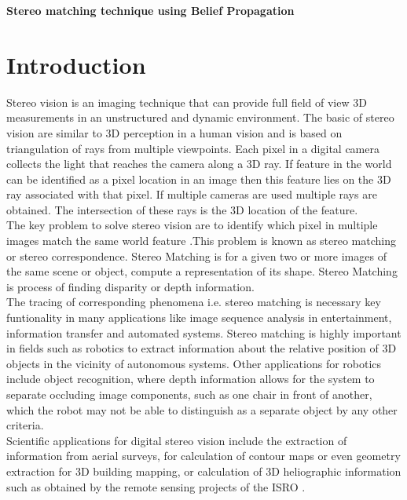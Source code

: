 
\textbf{\textbf{Stereo matching technique using Belief Propagation}}

%

\section{Introduction}
Stereo vision is an imaging technique that can provide full field of view 3D measurements in an unstructured and dynamic environment. The basic of stereo vision are similar to 3D perception in a human vision and is based on triangulation of rays from multiple viewpoints. Each pixel in a digital camera collects the light that reaches the camera along a 3D ray. If feature in the world can be identified as a pixel location in an image then this feature lies on the 3D ray associated with that pixel. If multiple cameras are used multiple rays are obtained. The intersection of these rays is the 3D location of the feature.\\
The key problem to solve stereo vision are to identify which pixel in multiple images match the same world feature .This problem is known as stereo matching or stereo correspondence. Stereo Matching is for a given two or more images of the same scene or object, compute a representation of its shape. Stereo Matching is process of finding disparity or depth information.\\
The tracing of corresponding phenomena i.e. stereo matching is necessary key funtionality in many applications like image sequence analysis in entertainment, information transfer and automated systems. Stereo matching is highly important in fields such as robotics to extract information about the relative position of 3D objects in the vicinity of autonomous systems. Other applications for robotics include object recognition, where depth information allows for the system to separate occluding image components, such as one chair in front of another, which the robot may not be able to distinguish as a separate object by any other criteria.\\
Scientific applications for digital stereo vision include the extraction of information from aerial surveys, for calculation of contour maps or even geometry extraction for 3D building mapping, or calculation of 3D heliographic information such as obtained by the remote sensing projects of the ISRO .

